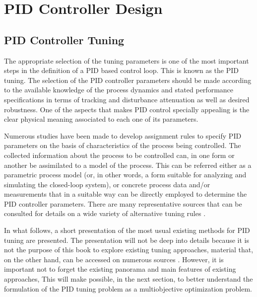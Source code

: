 \chapter{PID Controller Design}
\label{chap:PIDControllerDesign}

\section{PID Controller Tuning}
The appropriate selection of the tuning parameters is one of the most important steps in the definition of a PID based control loop. This is known as the PID tuning. The selection of the PID controller parameters should be made according to the available knowledge of the process dynamics and stated performance specifications in terms of tracking and disturbance attenuation as well as desired robustness. One of the aspects that makes PID control specially appealing is the clear physical meaning associated to each one of its parameters.

Numerous studies have been made to develop assignment rules to specify PID parameters on the basis of characteristics of the process being controlled. The collected information about the process to be controlled can, in one form or another be assimilated to a model of the process. This can be referred either as a parametric process model (or, in other words, a form suitable for analyzing and simulating the closed-loop system), or concrete process data and/or measurements that in a suitable way can be directly employed to determine the PID controller parameters. There are many representative sources that can be consulted for details on a wide variety of alternative tuning rules  \citep{odwyer2006}.

In what follows, a short presentation of the most usual existing methods for PID tuning are presented. The presentation will not be deep into details because it is not the purpose of this book to explore existing tuning approaches, material that, on the other hand, can be accessed on numerous sources \citep{VilanovaBook2012}.  However, it is important not to forget the existing panorama and main features of existing approaches, This will make possible, in the next section, to better understand the formulation of the PID tuning problem as a multiobjective optimization problem.

